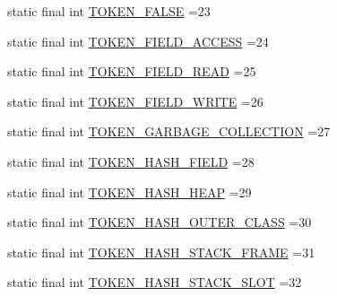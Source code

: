 \begin{DoxyCompactItemize}
\item 
static final int \hyperlink{classgov_1_1nasa_1_1jpf_1_1inspector_1_1server_1_1expression_1_1parser_1_1_expression_grammar_parser_a3a0da2b7f9e20c4fd550fa90a3063a7f}{T\+O\+K\+E\+N\+\_\+\+F\+A\+L\+SE} =23
\item 
static final int \hyperlink{classgov_1_1nasa_1_1jpf_1_1inspector_1_1server_1_1expression_1_1parser_1_1_expression_grammar_parser_a4d10f0bd0fd32a8126a088118c9da5d9}{T\+O\+K\+E\+N\+\_\+\+F\+I\+E\+L\+D\+\_\+\+A\+C\+C\+E\+SS} =24
\item 
static final int \hyperlink{classgov_1_1nasa_1_1jpf_1_1inspector_1_1server_1_1expression_1_1parser_1_1_expression_grammar_parser_a8f5b02cf5f44f22ac181bc2a7a2d2817}{T\+O\+K\+E\+N\+\_\+\+F\+I\+E\+L\+D\+\_\+\+R\+E\+AD} =25
\item 
static final int \hyperlink{classgov_1_1nasa_1_1jpf_1_1inspector_1_1server_1_1expression_1_1parser_1_1_expression_grammar_parser_a3b7cc9e131d6af08fb7faae2ef95b938}{T\+O\+K\+E\+N\+\_\+\+F\+I\+E\+L\+D\+\_\+\+W\+R\+I\+TE} =26
\item 
static final int \hyperlink{classgov_1_1nasa_1_1jpf_1_1inspector_1_1server_1_1expression_1_1parser_1_1_expression_grammar_parser_afa0da40e2e859e74d226887f17ee0640}{T\+O\+K\+E\+N\+\_\+\+G\+A\+R\+B\+A\+G\+E\+\_\+\+C\+O\+L\+L\+E\+C\+T\+I\+ON} =27
\item 
static final int \hyperlink{classgov_1_1nasa_1_1jpf_1_1inspector_1_1server_1_1expression_1_1parser_1_1_expression_grammar_parser_aa45b2e743ef219e476dfc39c577391f3}{T\+O\+K\+E\+N\+\_\+\+H\+A\+S\+H\+\_\+\+F\+I\+E\+LD} =28
\item 
static final int \hyperlink{classgov_1_1nasa_1_1jpf_1_1inspector_1_1server_1_1expression_1_1parser_1_1_expression_grammar_parser_a1da7bb4fec606d687fcf52dfb99fd2f2}{T\+O\+K\+E\+N\+\_\+\+H\+A\+S\+H\+\_\+\+H\+E\+AP} =29
\item 
static final int \hyperlink{classgov_1_1nasa_1_1jpf_1_1inspector_1_1server_1_1expression_1_1parser_1_1_expression_grammar_parser_aefee9e9c56459dd1e9ef51310172faa1}{T\+O\+K\+E\+N\+\_\+\+H\+A\+S\+H\+\_\+\+O\+U\+T\+E\+R\+\_\+\+C\+L\+A\+SS} =30
\item 
static final int \hyperlink{classgov_1_1nasa_1_1jpf_1_1inspector_1_1server_1_1expression_1_1parser_1_1_expression_grammar_parser_a2bb3cb353dbb47fc4041f1b4f99264b4}{T\+O\+K\+E\+N\+\_\+\+H\+A\+S\+H\+\_\+\+S\+T\+A\+C\+K\+\_\+\+F\+R\+A\+ME} =31
\item 
static final int \hyperlink{classgov_1_1nasa_1_1jpf_1_1inspector_1_1server_1_1expression_1_1parser_1_1_expression_grammar_parser_af911dcf03b24cbbe3be88f0445668139}{T\+O\+K\+E\+N\+\_\+\+H\+A\+S\+H\+\_\+\+S\+T\+A\+C\+K\+\_\+\+S\+L\+OT} =32

\end{DoxyCompactItemize}
